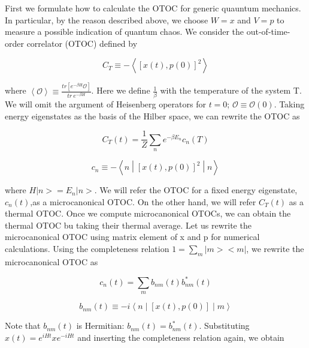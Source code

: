 \documentclass[12pt, letterpaper]{article}
\newcommand*{\1}{\hspace{1pt}}
\begin{document}
        First we formulate how to calculate the OTOC for generic quauntum mechanics. In particular, by the reason described above, we choose $W = x$ and $V = p$ to measure
        a possible indication of quantum chaos. We consider the out-of-time-order correlator (OTOC) defined by

        \begin{equation}
            C_{T} \equiv  - \left\langle\left[x(t),p(0)\right]^{2}\right\rangle
        \end{equation}

        where $\left\langle \mathcal{O} \right\rangle \equiv \frac{tr\left[e^{-\beta H }\mathcal{O}\right]}{tr \ e^{-\beta H}}$. Here we define $\frac{1}{\beta}$ with 
        the temperature of the system T. We will omit the argument of Heisenberg operators for $t=0$; $\mathcal{O} \equiv \mathcal{O}(0)$. Taking energy eigenstates as 
        the basis of the Hilber space, we can rewrite the OTOC as 

        \begin{equation}
            C_{T}(t) = \frac{1}{Z} \sum _{n} e^{-\beta E_{n}} c_{n}(T)
        \end{equation}

        \begin{equation}
            c_{n} \equiv -\left\langle n \middle|\left[x(t),p(0)\right]^{2}\middle| n\right\rangle
        \end{equation}

        where $H|n>=E_{n}|n>$. We will refer the OTOC for a fixed energy eigenstate, $c_{n}(t)$,as a microcanonical OTOC. On the other hand, we will refer $C_{T}(t)$ as a
        thermal OTOC. Once we compute microcanonical OTOCs, we can obtain the thermal OTOC bu taking their thermal average. Let us rewrite the microcanonical OTOC using 
        matrix element of x and p for numerical calculations. Using the completeness relation $1 = \sum_{m} |m><m|$, we rewrite the microcanonical OTOC as 

        \begin{equation}
            c_{n}(t) = \sum_{m} b_{nm}(t) b_{nm} ^{*} (t)  
        \end{equation}
        
        \begin{equation}
            b_{nm}(t) \equiv   -i\left\langle n \middle|\left[x(t),p(0)\right]\middle| m\right\rangle
        \end{equation}

        Note that $b_{nm}(t)$ is Hermitian: $b_{nm}(t) = b_{nm} ^{*} (t)$. Substituting $x(t) = e^{iHt}xe^{-iHt}$ and inserting the completeness relation again, we obtain
\end{document}
